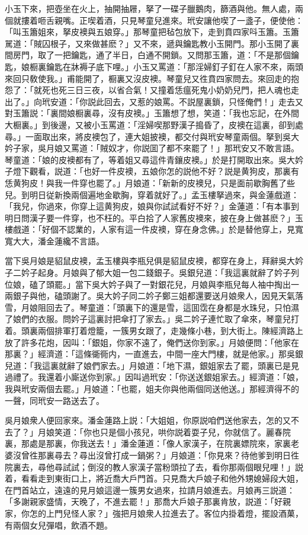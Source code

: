 小玉下來，把壺坐在火上，抽開抽屜，拏了一碟子臘鵝肉，篩酒與他。無人處，兩個就摟着咂舌親嘴。正喫着酒，只見琴童兒進來。玳安讓他喫了一盞子，便使他：「叫玉簫姐來，拏皮襖與五娘穿。」那琴童把毡包放下，走到賁四家呌玉簫。玉簫駡道：「賊囚根子，又來做甚麽？」又不來，遞與鑰匙教小玉開門。那小玉開了裏間房門，取了一把鑰匙，通了半日，白通不開鎖。又問那玉簫，道：「不是那個鑰匙，娘橱裏鑰匙在牀褥子底下哩。」小玉又罵道：「那淫婦釘子釘在人家不來，兩頭來回只敎使我。」甫能開了，橱裏又沒皮襖。琴童兒又徃賁四家問去。來回走的抱怨了：「就死也死三日三夜，以省合氣！又撞着恁瘟死鬼小奶奶兒門，把人魂也走出了。」向玳安道：「你説此回去，又惹的娘罵。不説屋裏鎖，只怪俺們！」走去又對玉簫説：「裏間娘橱裏尋，沒有皮襖。」玉簫想了想，笑道：「我也忘記，在外間大橱裏。」到後邊，又被小玉罵道：「淫婦喫那野漢子搗昏了，皮襖在這裏，卻到處尋。」一面取出來，將皮襖包了，連大姐披襖，都交付與玳安琴童兩個。拏到吳大妗子家，吳月娘又罵道：「賊奴才，你説囬了都不來罷了！」那玳安又不敢言語。琴童道：「娘的皮襖都有了，等着姐又尋這件青鑲皮襖。」於是打開取出來。吳大妗子燈下觀看，説道：「也好一件皮襖，五娘你怎的説他不好？説是黄狗皮，那裏有恁黄狗皮！與我一件穿也罷了。」月娘道：「新新的皮襖兒，只是面前歇胸舊了些兒。到明日従新換兩個遍地金歇胸，穿着就好了。」孟玉樓拏過來，與金蓮戲道：「我兒，你過來，你穿上這黄狗皮，娘與你試試看好不好？」金蓮道：「有本事到明日問漢子要一件穿，也不枉的。平白拾了人家舊皮襖來，披在身上做甚麽？」玉樓戲道：「好個不認業的，人家有這一件皮襖，穿在身念佛。」於是替他穿上，見寬寬大大，潘金蓮纔不言語。

當下吳月娘是貂鼠皮襖，孟玉樓與李瓶兒俱是貂鼠皮襖，都穿在身上，拜辭吳大妗子二妗子起身。月娘與了郁大姐一包二錢銀子。吳銀兒道：「我這裏就辭了妗子列位娘，磕了頭罷。」當下吳大妗子與了一對銀花兒，月娘與李瓶兒每人袖中掏出一兩銀子與他，磕頭謝了。吳大妗子同二妗子鄭三姐都還要送月娘衆人，因見天氣落雪，月娘阻回去了。琴童道：「頭裏下的還是雪，這囬霑在身都是水珠兒，只怕濕了娘們的衣服。問妗子這裏討把傘打了家去。」吳二妗子連忙取了傘來，琴童兒打着。頭裏兩個排軍打着燈籠，一簇男女跟了，走幾條小巷，到大街上。陳經濟路上放了許多花炮，因叫：「銀姐，你家不遠了，俺們送你到家。」月娘便問：「他家在那裏？」經濟道：「這條衚衕内，一直進去，中間一座大門樓，就是他家。」那吳銀兒道：「我這裏就辭了娘們家去。」月娘道：「地下濕，銀姐家去了罷，頭裏已是見過禮了。我還着小廝送你到家。」因叫過玳安：「你送送銀姐家去。」經濟道：「娘，我與玳安兩個去罷。」月娘道：「也罷，姐夫你與他兩個同送他送。」那經濟得不的一聲，同玳安一路送去了。

吳月娘衆人便回家來。潘金蓮路上説：「大姐姐，你原説咱們送他家去，怎的又不去了？」月娘笑道：「你也只是個小孩兒，哄你説着耍子兒，你就信了。麗春院裏，那處是那裏，你我送去！」潘金蓮道：「像人家漢子，在院裏嫖院來，家裏老婆沒曾徃那裏尋去？尋出沒曾打成一鍋粥？」月娘道：「你見來？待他爹到明日徃院裏去，尋他尋試試；倒沒的教人家漢子當粉頭拉了去，看你那兩個眼兒哩！」説着，看看走到東街口上，將近喬大戶門首。只見喬大戶娘子和他外甥媳婦段大姐，在門首站立，遠遠的見月娘這邊一簇男女過來，拉請月娘進去。月娘再三説道：「多謝親家盛情，天晚了，不進去罷！」那喬大戶娘子那裏肯放，説道：「好親家，你怎的上門兒怪人家？」強把月娘衆人拉進去了。客位内掛着燈，擺設酒菓，有兩個女兒彈唱，飲酒不題。

